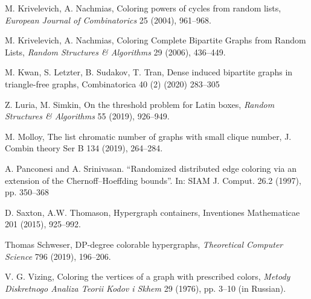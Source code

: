 \documentclass[12pt]{article}
\newcommand{\1}{\mathds{1}}
\begin{document}
\begin{thebibliography}{}
M. Krivelevich, A. Nachmias, 
Coloring powers of cycles from random lists,
\emph{European Journal of Combinatorics} 25 (2004), 961--968.


M. Krivelevich, A. Nachmias,
Coloring Complete Bipartite Graphs from Random Lists,
\emph{Random Structures \& Algorithms} 29 (2006), 436--449. 

M. Kwan, S. Letzter, B. Sudakov, T. Tran,
Dense induced bipartite graphs in triangle-free graphs,
Combinatorica 40 (2) (2020) 283–305

Z. Luria, M. Simkin,
On the threshold problem for Latin boxes,
{\em Random Structures \& Algorithms} 55 (2019), 926--949.

M. Molloy,
The list chromatic number of graphs with small clique number,
J. Combin theory Ser B 134 (2019), 264--284.

A. Panconesi and A. Srinivasan. “Randomized distributed edge coloring via an extension
of the Chernoff–Hoeffding bounds”. In: SIAM J. Comput. 26.2 (1997), pp. 350–368


D. Saxton, A.W. Thomason, Hypergraph containers, Inventiones 
Mathematicae 201 (2015), 925--992.

Thomas Schweser,
DP-degree colorable hypergraphs,
{\em Theoretical Computer Science}  796 (2019), 196--206.


V. G. Vizing, 
Coloring the vertices of a graph with prescribed colors,
\emph{Metody Diskretnogo Analiza Teorii Kodov i Skhem} 29 (1976),
pp. 3--10 (in Russian). 


 \end{thebibliography}{}
\end{document}
